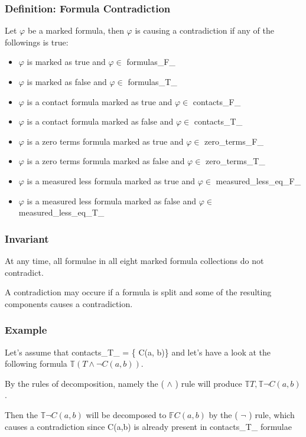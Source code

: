\documentclass{article}
\begin{document}
		\subsubsection*{Definition: Formula Contradiction}
			Let $\varphi$ be a marked formula, then $\varphi$ is causing a contradiction if any of the followings is true:
			\begin{itemize}
				\item $\varphi$ is marked as true and $\varphi \in$ formulas\_F\_
				\item $\varphi$ is marked as false and $\varphi \in$ formulas\_T\_
				\item $\varphi$ is a contact formula marked as true and $\varphi \in$ contacts\_F\_
				\item $\varphi$ is a contact formula marked as false and $\varphi \in$ contacts\_T\_
				\item $\varphi$ is a zero terms formula marked as true and $\varphi \in$ zero\_terms\_F\_
				\item $\varphi$ is a zero terms formula marked as false and $\varphi \in$ zero\_terms\_T\_
				\item $\varphi$ is a measured less formula marked as true and $\varphi \in$ measured\_less\_eq\_F\_
				\item $\varphi$ is a measured less formula marked as false and $\varphi \in$ measured\_less\_eq\_T\_

			\end{itemize}

		\subsubsection*{Invariant}
			At any time, all formulae in all eight marked formula collections do not contradict.

			A contradiction may occure if a formula is split and some of the resulting components causes a contradiction.

		\subsubsection*{Example}
			Let's assume that contacts\_T\_ = \{ C(a, b)\} and let's have a look at the following formula $\mathbb{T}(T \wedge \neg C(a,b))$.

			By the rules of decomposition, namely the ( $\wedge$ ) rule will produce $\mathbb{T}T, \mathbb{T}\neg C(a,b)$. 

			Then the $\mathbb{T}\neg C(a,b)$ will be decomposed to $\mathbb{F} C(a,b)$ by the ( $\neg$ ) rule, which causes a contradiction
			since C(a,b) is already present in contacts\_T\_ formulae
\end{document}
